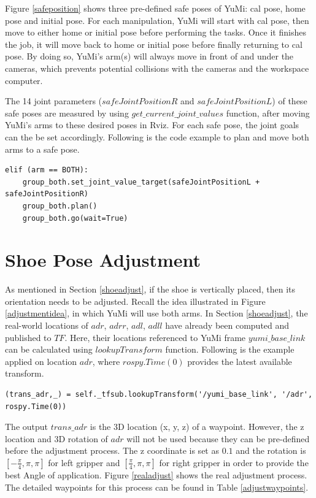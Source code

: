 Figure \ref{safeposition} shows three pre-defined safe poses of YuMi: cal pose, home pose and initial pose. For each manipulation, YuMi will start with cal pose, then move to either home or initial pose before performing the tasks. Once it finishes the job, it will move back to home or initial pose before finally returning to cal pose. By doing so, YuMi's arm(s) will always move in front of and under the cameras, which prevents potential collisions with the cameras and the workspace computer.

The 14 joint parameters ($safeJointPositionR$ and $safeJointPositionL$) of these safe poses are measured by using $get\_current\_joint\_values$ function, after moving YuMi's arms to
these desired poses in Rviz. For each safe pose, the joint goals can the be set accordingly. Following is the code example to plan and move both arms to a safe pose.

\begin{verbatim}
elif (arm == BOTH):
    group_both.set_joint_value_target(safeJointPositionL + safeJointPositionR)
    group_both.plan()
    group_both.go(wait=True)
\end{verbatim}

\section{Shoe Pose Adjustment} \label{adj}
As mentioned in Section \ref{shoeadjust}, if the shoe is vertically placed, then its orientation needs to be adjusted. Recall the idea illustrated in Figure \ref{adjustmentidea}, in which YuMi will use both arms. In Section \ref{shoeadjust}, the real-world locations of $adr$, $adrr$, $adl$, $adll$ have already been computed and published to $TF$.
Here, their locations referenced to YuMi frame $yumi\_base\_link$ can be calculated using $lookupTransform$ function. Following is the example applied on location $adr$, where $rospy.Time(0)$ provides the latest available transform.

\begin{verbatim}
(trans_adr,_) = self._tfsub.lookupTransform('/yumi_base_link', '/adr', rospy.Time(0))
\end{verbatim}

The output $trans\_adr$ is the 3D location (x, y, z) of a waypoint. However, the z location and 3D rotation of $adr$ will not be used because they can be pre-defined before the adjustment process. The z coordinate is set as $0.1$ and the rotation is $[-\frac{\pi}{4}, \pi, \pi]$ for left gripper and $[\frac{\pi}{4}, \pi, \pi]$ for right gripper in order to provide the best Angle of application. Figure \ref{realadjust} shows the real adjustment process. The detailed waypoints for this process can be found in Table \ref{adjustwaypoints}.


